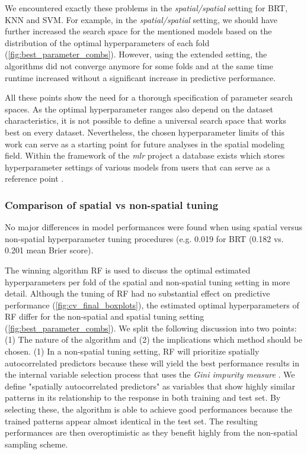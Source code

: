 \documentclass[review]{elsarticle}
\begin{document}
We encountered exactly these problems in the \emph{spatial/spatial} setting for BRT, KNN and SVM.
For example, in the \emph{spatial/spatial} setting, we should have further increased the search space for the mentioned models based on the distribution of the optimal hyperparameters of each fold (\autoref{fig:best_parameter_combs}).
However, using the extended setting, the algorithms did not converge anymore for some folds and at the same time runtime increased without a significant increase in predictive performance.

All these points show the need for a thorough specification of parameter search spaces.
As the optimal hyperparameter ranges also depend on the dataset characteristics, it is not possible to define a universal search space that works best on every dataset.
Nevertheless, the chosen hyperparameter limits of this work can serve as a starting point for future analyses in the spatial modeling field.
Within the framework of the \textit{mlr} project a database exists which stores hyperparameter settings of various models from users that can serve as a reference point \citep{mlrhyperopt}.

\subsubsection{Comparison of spatial vs non-spatial tuning}
No major differences in model performances were found when using spatial versus non-spatial hyperparameter tuning procedures (e.g. 0.019 for \ac{BRT} (0.182 vs. 0.201 mean Brier score).

The winning algorithm RF is used to discuss the optimal estimated hyperparameters per fold of the spatial and non-spatial tuning setting in more detail.
Although the tuning of RF had no substantial effect on predictive performance (\autoref{fig:cv_final_boxplots}), the estimated optimal hyperparameters of RF differ for the non-spatial and spatial tuning setting (\autoref{fig:best_parameter_combs}).
We split the following discussion into two points: (1) The nature of the algorithm and (2) the implications which method should be chosen.
(1) In a non-spatial tuning setting, RF will prioritize spatially autocorrelated predictors because these will yield the best performance results in the internal variable selection process that uses the \textit{Gini impurity measure} \citep{Biau2016, Gordon1984}.
We define "spatially autocorrelated predictors" as variables that show highly similar patterns in its relationship to the response in both training and test set.
By selecting these, the algorithm is able to achieve good performances because the trained patterns appear almost identical in the test set.
The resulting performances are then overoptimistic as they benefit highly from the non-spatial sampling scheme.
\end{document}
